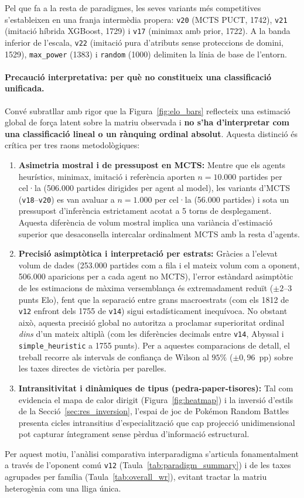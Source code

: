 Pel que fa a la resta de paradigmes, les seves variants més competitives s'estableixen en una franja intermèdia propera: \texttt{v20} (MCTS PUCT, 1742), \texttt{v21} (imitació híbrida XGBoost, 1729) i \texttt{v17} (minimax amb prior, 1722). A la banda inferior de l'escala, \texttt{v22} (imitació pura d'atributs sense proteccions de domini, 1529), \texttt{max\_power} (1383) i \texttt{random} (1000) delimiten la línia de base de l'entorn.

\paragraph{Precaució interpretativa: per què no constitueix una classificació unificada.}
Convé subratllar amb rigor que la Figura~\ref{fig:elo_bars} reflecteix una estimació global de força latent sobre la matriu observada i \textbf{no s'ha d'interpretar com una classificació lineal o un rànquing ordinal absolut}. Aquesta distinció és crítica per tres raons metodològiques:
\begin{enumerate}
    \item \textbf{Asimetria mostral i de pressupost en MCTS:} Mentre que els agents heurístics, minimax, imitació i referència aporten $n=10.000$ partides per cel·la (506.000 partides dirigides per agent al model), les variants d'MCTS (\texttt{v18}--\texttt{v20}) es van avaluar a $n=1.000$ per cel·la (56.000 partides) i sota un pressupost d'inferència estrictament acotat a 5 torns de desplegament. Aquesta diferència de volum mostral implica una variància d'estimació superior que desaconsella intercalar ordinalment MCTS amb la resta d'agents.
    \item \textbf{Precisió asimptòtica i interpretació per estrats:} Gràcies a l'elevat volum de dades (253.000 partides com a fila i el mateix volum com a oponent, 506.000 aparicions per a cada agent no MCTS), l'error estàndard asimptòtic de les estimacions de màxima versemblança és extremadament reduït ($\pm 2$--$3$ punts Elo), fent que la separació entre grans macroestrats (com els 1812 de \texttt{v12} enfront dels 1755 de \texttt{v14}) sigui estadísticament inequívoca. No obstant això, aquesta precisió global no autoritza a proclamar superioritat ordinal \emph{dins} d'un mateix altiplà (com les diferències decimals entre \texttt{v14}, Abyssal i \texttt{simple\_heuristic} a 1755 punts). Per a aquestes comparacions de detall, el treball recorre als intervals de confiança de Wilson al $95\%$ ($\pm 0{,}96$~pp) sobre les taxes directes de victòria per parelles.
    \item \textbf{Intransitivitat i dinàmiques de tipus (pedra-paper-tisores):} Tal com evidencia el mapa de calor dirigit (Figura~\ref{fig:heatmap}) i la inversió d'estils de la Secció~\ref{sec:res_inversion}, l'espai de joc de Pokémon Random Battles presenta cicles intransitius d'especialització que cap projecció unidimensional pot capturar íntegrament sense pèrdua d'informació estructural.
\end{enumerate}
Per aquest motiu, l'anàlisi comparativa interparadigma s'articula fonamentalment a través de l'oponent comú \texttt{v12} (Taula~\ref{tab:paradigm_summary}) i de les taxes agrupades per família (Taula~\ref{tab:overall_wr}), evitant tractar la matriu heterogènia com una lliga única.

